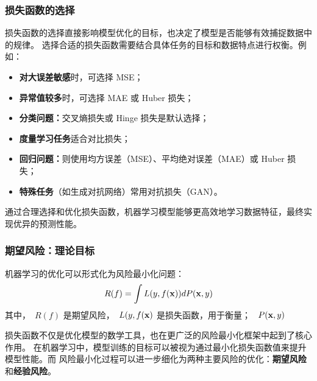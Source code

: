 \subsubsection{损失函数的选择}
损失函数的选择直接影响模型优化的目标，也决定了模型是否能够有效捕捉数据中的规律。
选择合适的损失函数需要结合具体任务的目标和数据特点进行权衡。例如：
\begin{itemize}
\item {\bf 对大误差敏感}时，可选择 MSE；
\item {\bf 异常值较多}时，可选择 MAE 或 Huber 损失；
\item {\bf 分类问题：}交叉熵损失或 Hinge 损失是默认选择；
\item {\bf 度量学习任务}适合对比损失；
\item {\bf 回归问题：}则使用均方误差（MSE）、平均绝对误差（MAE）或 Huber 损失；
\item {\bf 特殊任务}（如生成对抗网络）常用对抗损失（GAN）。
\end{itemize}
通过合理选择和优化损失函数，机器学习模型能够更高效地学习数据特征，最终实现优异的预测性能。

%


\subsubsection{ 期望风险：理论目标}


机器学习的优化可以形式化为风险最小化问题：
$$
R(f) = \int L(y,f({\bf x})) dP({\bf x},y)
$$
其中，~$R(f)$ 是期望风险，~$L(y,f({\bf x})$ 是损失函数，用于衡量；  ~$P({\bf x},y)$ 

损失函数不仅是优化模型的数学工具，也在更广泛的风险最小化框架中起到了核心作用。
在机器学习中，模型训练的目标可以被视为通过最小化损失函数值来提升模型性能。而
风险最小化过程可以进一步细化为两种主要风险的优化：{\bf 期望风险}和{\bf 经验风险}。

